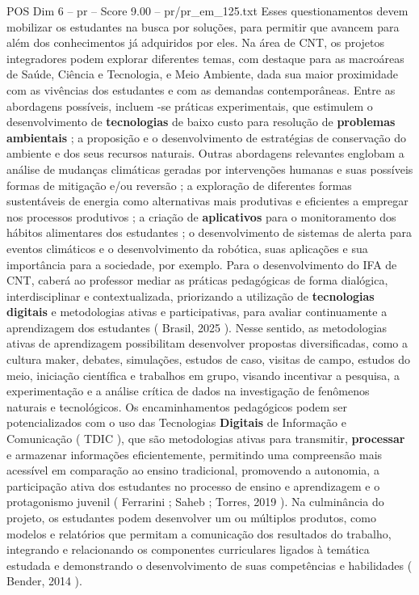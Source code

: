 \begin{textsample}{POS Dim 6 – pr – Score 9.00 – pr/pr\_em\_125.txt}
Esses questionamentos devem mobilizar os estudantes na busca por soluções, para permitir que avancem para além dos conhecimentos já adquiridos por eles.
Na área de CNT, os projetos integradores podem explorar diferentes temas, com destaque para as macroáreas de Saúde, Ciência e Tecnologia, e Meio Ambiente, dada sua maior proximidade com as vivências dos estudantes e com as demandas contemporâneas.
Entre as abordagens possíveis, incluem -se práticas experimentais, que estimulem o desenvolvimento de \textbf{tecnologias} de baixo custo para resolução de \textbf{problemas} \textbf{ambientais} ; a proposição e o desenvolvimento de estratégias de conservação do ambiente e dos seus recursos naturais.
Outras abordagens relevantes englobam a análise de mudanças climáticas geradas por intervenções humanas e suas possíveis formas de mitigação e/ou reversão ; a exploração de diferentes formas sustentáveis de energia como alternativas mais produtivas e eficientes a empregar nos processos produtivos ; a criação de \textbf{aplicativos} para o monitoramento dos hábitos alimentares dos estudantes ; o desenvolvimento de sistemas de alerta para eventos climáticos e o desenvolvimento da robótica, suas aplicações e sua importância para a sociedade, por exemplo.
Para o desenvolvimento do IFA de CNT, caberá ao professor mediar as práticas pedagógicas de forma dialógica, interdisciplinar e contextualizada, priorizando a utilização de \textbf{tecnologias} \textbf{digitais} e metodologias ativas e participativas, para avaliar continuamente a aprendizagem dos estudantes ( Brasil, 2025 ).
Nesse sentido, as metodologias ativas de aprendizagem possibilitam desenvolver propostas diversificadas, como a cultura maker, debates, simulações, estudos de caso, visitas de campo, estudos do meio, iniciação científica e trabalhos em grupo, visando incentivar a pesquisa, a experimentação e a análise crítica de dados na investigação de fenômenos naturais e tecnológicos.
Os encaminhamentos pedagógicos podem ser potencializados com o uso das Tecnologias \textbf{Digitais} de Informação e Comunicação ( TDIC ), que são metodologias ativas para transmitir, \textbf{processar} e armazenar informações eficientemente, permitindo uma compreensão mais acessível em comparação ao ensino tradicional, promovendo a autonomia, a participação ativa dos estudantes no processo de ensino e aprendizagem e o protagonismo juvenil ( Ferrarini ; Saheb ; Torres, 2019 ).
Na culminância do projeto, os estudantes podem desenvolver um ou múltiplos produtos, como modelos e relatórios que permitam a comunicação dos resultados do trabalho, integrando e relacionando os componentes curriculares ligados à temática estudada e demonstrando o desenvolvimento de suas competências e habilidades ( Bender, 2014 ).

\end{textsample}
